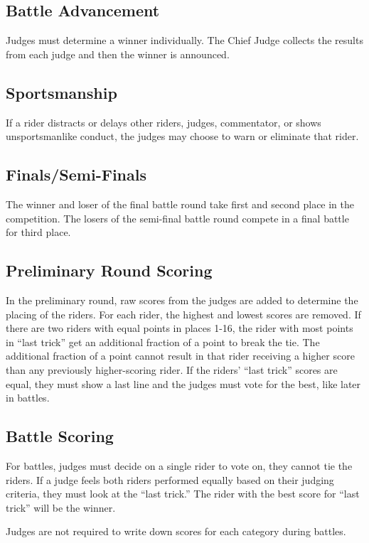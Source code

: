 \subsection{Battle Advancement \label{subsec:flat\itemstreet_flatland\itemjudging\itemscoring_battle}}
Judges must determine a winner individually.
The Chief Judge collects the results from each judge and then the winner is announced.

\subsection{Sportsmanship}
If a rider distracts or delays other riders, judges, commentator, or shows unsportsmanlike conduct, the judges may choose to warn or eliminate that rider.

\subsection{Finals/Semi-Finals}
The winner and loser of the final battle round take first and second place in the competition. The losers of the semi-final battle round compete in a final battle for third place.

\subsection{Preliminary Round Scoring}
In the preliminary round, raw scores from the judges are added to determine the placing of the riders.
For each rider, the highest and lowest scores are removed. %
If there are two riders with equal points in places 1-16, the rider with most points in ``last trick'' get an additional fraction of a point to break the tie.
The additional fraction of a point cannot result in that rider receiving a higher score than any previously higher-scoring rider.
If the riders' ``last trick'' scores are equal, they must show a last line and the judges must vote for the best, like later in battles.

\subsection{Battle Scoring}
For battles, judges must decide on a single rider to vote on, they cannot tie the riders.
If a judge feels both riders performed equally based on their judging criteria, they must look at the ``last trick.''
The rider with the best score for ``last trick'' will be the winner.

Judges are not required to write down scores for each category during battles.
